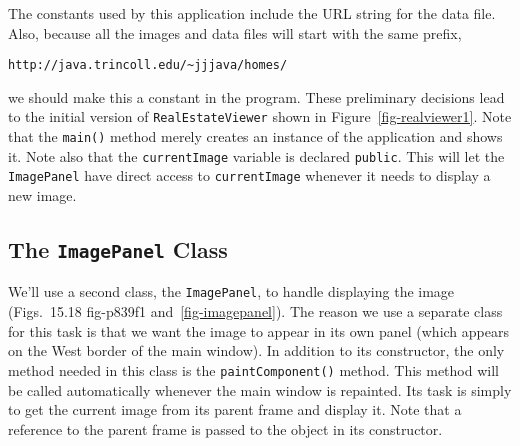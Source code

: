 {The constants used by this application include the URL string for the
data file. Also, because all the
images and data files will start with the same prefix,

\begin{jjjlisting}
\begin{lstlisting}[commentstyle=\color{black}]
http://java.trincoll.edu/~jjjava/homes/
\end{lstlisting}
\end{jjjlisting}

\noindent we should make this a constant in the program.  These preliminary
decisions lead to the initial version of {\tt RealEstateViewer} shown
in Figure~\ref{fig-realviewer1}. Note that the {\tt main()} method
merely creates an instance of the application and shows it.  Note also
that the {\tt currentImage} variable is declared {\tt public}. This
will let the {\tt ImagePanel} have direct access to {\tt currentImage}
whenever it needs to display a new image.

\pagebreak
\subsection*{The {\tt ImagePanel} Class}
\noindent We'll use a second class, the {\tt ImagePanel}, to handle 
displaying  the image (Figs.~15.18
{fig-p839f1}
and~\ref{fig-imagepanel}). The reason we use a separate class for this
task is that we want the image to appear in its own panel (which
appears on the West border of the main window). In addition to its
constructor, the only method needed in this class
is the {\tt paintComponent()} method.  This method will be called
automatically whenever the main window is repainted.  Its task is
simply to get the current image from its parent frame and display
it.  Note that a reference to the parent frame is passed to the object
in its constructor.

}
